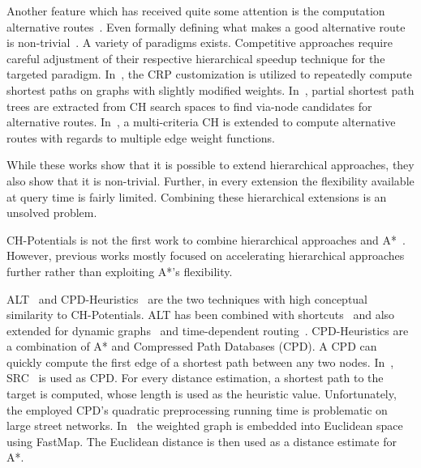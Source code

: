\documentclass[manuscript,review]{acmart}
\begin{document}
Another feature which has received quite some attention is the computation alternative routes~\cite{bdgs-argrn-11,adgw-arrn-13}.
Even formally defining what makes a good alternative route is non-trivial~\cite{bdgs-argrn-11}.
A variety of paradigms exists.
Competitive approaches require careful adjustment of their respective hierarchical speedup technique for the targeted paradigm.
In~\cite{krs-eepma-13}, the CRP customization is utilized to repeatedly compute shortest paths on graphs with slightly modified weights.
In~\cite{k-hdara-13}, partial shortest path trees are extracted from CH search spaces to find via-node candidates for alternative routes.
In~\cite{barth2019alternative}, a multi-criteria CH is extended to compute alternative routes with regards to multiple edge weight functions.

While these works show that it is possible to extend hierarchical approaches, they also show that it is non-trivial.
Further, in every extension the flexibility available at query time is fairly limited.
Combining these hierarchical extensions is an unsolved problem.

CH-Potentials is not the first work to combine hierarchical approaches and A*~\cite{bdsssw-chgds-10,gkw-blwr-07,bdgwz-sfpcs-19}.
However, previous works mostly focused on accelerating hierarchical approaches further rather than exploiting A*'s flexibility.

ALT~\cite{gh-cspas-05,gw-cppsp-05} and CPD-Heuristics~\cite{DBLP:conf/ijcai/BonoGHS19} are the two techniques with high conceptual similarity to CH-Potentials.
ALT has been combined with shortcuts~\cite{bdsssw-chgds-10} and also extended for dynamic graphs~\cite{dw-lbrdg-07} and time-dependent routing~\cite{ndls-bastd-12,dn-crdtd-12}.
%
CPD-Heuristics are a combination of A* and Compressed Path Databases (CPD).
A CPD can quickly compute the first edge of a shortest path between any two nodes.
In~\cite{DBLP:conf/ijcai/BonoGHS19}, SRC~\cite{DBLP:conf/socs/StrasserHB14} is used as CPD.
For every distance estimation, a shortest path to the target is computed, whose length is used as the heuristic value.
Unfortunately, the employed CPD's quadratic preprocessing running time is problematic on large street networks.
%
%
In~\cite{DBLP:conf/ijcai/0002UJAKK18} the weighted graph is embedded into Euclidean space using FastMap. %
The Euclidean distance is then used as a distance estimate for A*.
\end{document}
